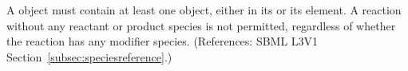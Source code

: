 \removedRule
  {A \Reaction object must contain at least one \SpeciesReference object,
either in its  or its 
element.  A reaction without any reactant or product species is not
permitted, regardless of whether the reaction has any modifier species.}
  {(References: SBML L3V1 Section~\ref{subsec:speciesreference}.)}
